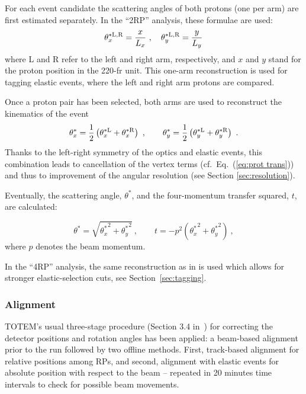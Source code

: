 For each event candidate the scattering angles of both protons (one per arm) are first estimated separately. In the ``2RP'' analysis, these formulae are used:
\begin{equation}
\label{eq:kin 1a}
	\theta^{*\rm L,R}_x = {x\over L_x}\ ,\quad \theta^{*\rm L,R}_y = {y\over L_y}
\end{equation}
where L and R refer to the left and right arm, respectively, and $x$ and $y$ stand for the proton position in the 220-fr unit. This one-arm reconstruction is used for tagging elastic events, where the left and right arm protons are compared.

Once a proton pair has been selected, both arms are used to reconstruct the kinematics of the event
\begin{equation}
\label{eq:kin 2a}
		\theta_x^* = {1\over 2} \left( \theta^{*\rm L}_x + \theta^{*\rm R}_x \right)\ ,\qquad
		\theta_y^* = {1\over 2} \left( \theta^{*\rm L}_y + \theta^{*\rm R}_y \right)\ .
\end{equation}
Thanks to the left-right symmetry of the optics and elastic events, this combination leads to cancellation of the vertex terms (cf.~Eq.~(\ref{eq:prot trans})) and thus to improvement of the angular resolution (see Section \ref{sec:resolution}).

Eventually, the scattering angle, $\theta^*$, and the four-momentum transfer squared, $t$, are calculated:

\begin{equation}
\label{eq:th t}
\theta^* = \sqrt{{\theta_x^*}^2 + {\theta_y^*}^2}\ ,\qquad t = - p^2 ({\theta_x^*}^2 + {\theta_y^*}^2)\ ,
\end{equation}
where $p$ denotes the beam momentum.

In the ``4RP'' analysis, the same reconstruction as in \cite{totem-1km} is used which allows for stronger elastic-selection cuts, see Section~\ref{sec:tagging}.




\subsubsection{Alignment}
\label{sec:alignment}

TOTEM's usual three-stage procedure (Section 3.4 in~\cite{totem-ijmp}) for correcting the detector positions and rotation angles has been applied: a beam-based alignment prior to the run followed by two offline methods. First, track-based alignment for relative positions among RPs, and second, alignment with elastic events for absolute position with respect to the beam -- repeated in 20 minutes time intervals to check for possible beam movements.

